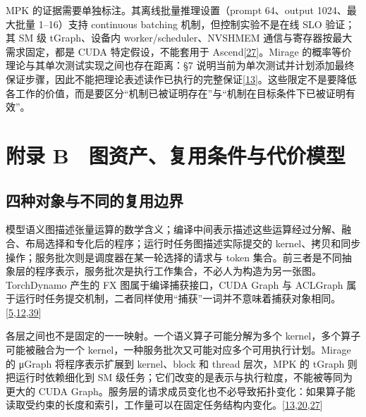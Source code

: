 \documentclass[
  UTF8,
  zihao=5]{ctexart}
\begin{document}
MPK 的证据需要单独标注。其离线批量推理设置（prompt 64、output
1024、最大批量 1--16）支持 continuous batching 机制，但控制实验不是在线
SLO 验证；其 SM 级 tGraph、设备内 worker/scheduler、NVSHMEM
通信与寄存器按最大需求固定，都是 CUDA 特定假设，不能套用于
Ascend{[}\protect\hyperlink{ref-cheng2026mpk}{27}{]}。Mirage
的概率等价理论与其单次测试实现之间也存在距离：§7
说明当前为单次测试并计划添加最终保证步骤，因此不能把理论表述读作已执行的完整保证{[}\protect\hyperlink{ref-wu2025mirage}{13}{]}。这些限定不是要降低各工作的价值，而是要区分``机制已被证明存在''与``机制在目标条件下已被证明有效''。

\hypertarget{ux9644ux5f55-b-ux56feux8d44ux4ea7ux590dux7528ux6761ux4ef6ux4e0eux4ee3ux4ef7ux6a21ux578b}{%
\section*{附录
B　图资产、复用条件与代价模型}\label{ux9644ux5f55-b-ux56feux8d44ux4ea7ux590dux7528ux6761ux4ef6ux4e0eux4ee3ux4ef7ux6a21ux578b}}

\hypertarget{ux56dbux79cdux5bf9ux8c61ux4e0eux4e0dux540cux7684ux590dux7528ux8fb9ux754c}{%
\subsection*{四种对象与不同的复用边界}\label{ux56dbux79cdux5bf9ux8c61ux4e0eux4e0dux540cux7684ux590dux7528ux8fb9ux754c}}

模型语义图描述张量运算的数学含义；编译中间表示描述这些运算经过分解、融合、布局选择和专化后的程序；运行时任务图描述实际提交的
kernel、拷贝和同步操作；服务批次则是调度器在某一轮选择的请求与 token
集合。前三者是不同抽象层的程序表示，服务批次是执行工作集合，不必人为构造为另一张图。TorchDynamo
产生的 FX 图属于编译捕获接口，CUDA Graph 与 ACLGraph
属于运行时任务提交机制，二者同样使用``捕获''一词并不意味着捕获对象相同。{[}\protect\hyperlink{ref-cann900overview}{5},\protect\hyperlink{ref-ansel2024pytorch2}{12},\protect\hyperlink{ref-nvidia2025cudaguide}{39}{]}

各层之间也不是固定的一一映射。一个语义算子可能分解为多个
kernel，多个算子可能被融合为一个
kernel，一种服务批次又可能对应多个可用执行计划。Mirage 的 μGraph
将程序表示扩展到 kernel、block 和 thread 层次，MPK 的 tGraph
则把运行时依赖细化到 SM
级任务；它们改变的是表示与执行粒度，不能被等同为更大的 CUDA
Graph。服务层的请求成员变化也不必导致拓扑变化：如果算子能读取受约束的长度和索引，工作量可以在固定任务结构内变化。{[}\protect\hyperlink{ref-wu2025mirage}{13},\protect\hyperlink{ref-ye2025flashinfer}{20},\protect\hyperlink{ref-cheng2026mpk}{27}{]}
\end{document}
